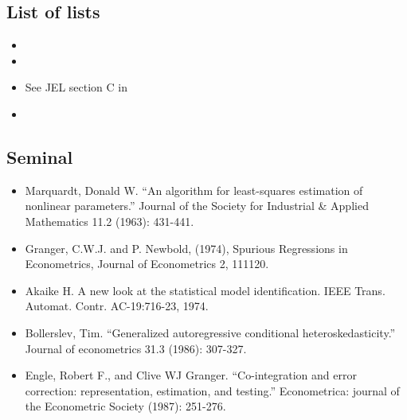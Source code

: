 \documentclass[letterpaper,10pt,english]{sphinxmanual}
\begin{document}
\subsection{List of lists}
\label{\detokenize{references:list-of-lists}}\begin{itemize}
\item {} 

\item {} 

\item {} 
See JEL section C in 

\item {} 

\end{itemize}


\subsection{Seminal}
\label{\detokenize{references:seminal}}\begin{itemize}
\item {} 
Marquardt, Donald W. “An algorithm for least-squares estimation of nonlinear parameters.” Journal of the Society for Industrial \& Applied Mathematics 11.2 (1963): 431-441.

\item {} 
Granger, C.W.J. and P. Newbold, (1974), Spurious Regressions in Econometrics, Journal of Econometrics 2, 111\textendash{}120.

\item {} 
Akaike  H.  A  new  look  at  the  statistical  model  identification.  IEEE  Trans.  Automat.  Contr. AC-19:716-23,  1974.

\item {} 
Bollerslev, Tim. “Generalized autoregressive conditional heteroskedasticity.” Journal of econometrics 31.3 (1986): 307-327.

\item {} 
Engle, Robert F., and Clive WJ Granger. “Co-integration and error correction: representation, estimation, and testing.” Econometrica: journal of the Econometric Society (1987): 251-276.

\end{itemize}
\end{document}

